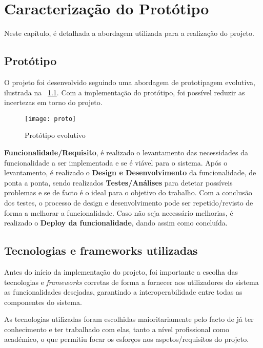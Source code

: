 
\chapter{Caracterização do Protótipo}
\label{cha:prototipo}

Neste capítulo, é detalhada a abordagem utilizada para a realização do projeto.

\section{Protótipo}

O projeto foi desenvolvido seguindo uma abordagem de prototipagem evolutiva, ilustrada na \figurename~\ref{fig:proto}. Com a implementação do protótipo, foi possível reduzir as incertezas em torno do projeto.

\begin{figure}[ht]
	\centering
	\texttt{[image: proto]}
	  \caption{Protótipo evolutivo}
  \label{fig:proto}
\end{figure}

\textbf{Funcionalidade/Requisito}, é realizado o levantamento das necessidades da funcionalidade a ser implementada e se é viável para o sistema. Após o levantamento, é realizado o \textbf{Design e Desenvolvimento} da funcionalidade, de ponta a ponta, sendo realizados \textbf{Testes/Análises} para detetar possíveis problemas e se de facto é o ideal para o objetivo do trabalho. Com a conclusão dos testes, o processo de design e desenvolvimento pode ser repetido/revisto de forma a melhorar a funcionalidade. Caso não seja necessário melhorias, é realizado o \textbf{Deploy da funcionalidade}, dando assim como concluída. 

\section{Tecnologias e frameworks utilizadas}

Antes do início da implementação do projeto, foi importante a escolha das tecnologias e \textit{frameworks} corretas de forma a fornecer aos utilizadores do sistema as funcionalidades desejadas, garantindo a interoperabilidade entre todas as componentes do sistema.   

As tecnologias utilizadas foram escolhidas maioritariamente pelo facto de já ter conhecimento e ter trabalhado com elas, tanto a nível profissional como académico, o que permitiu focar os esforços nos aspetos/requisitos do projeto.

